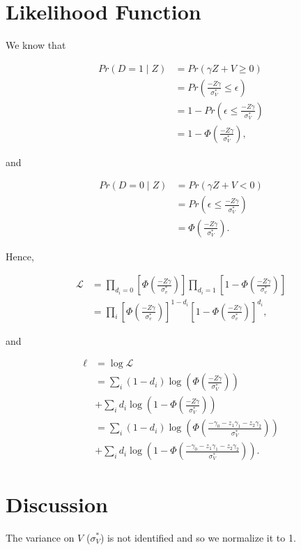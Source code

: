 \documentclass[9pt,twocolumn,twoside,]{pnas-new}
\begin{document}
\hypertarget{likelihood-function}{%
\section{Likelihood Function}\label{likelihood-function}}

We know that

\begin{align*}
Pr\left(D = 1 \mid Z\right) &= Pr\left(\gamma Z + V \geq 0 \right) \\
&= Pr\left( \frac{-Z\gamma}{\sigma^*_V} \leq \epsilon \right) \\
&= 1 - Pr\left( \epsilon \leq \frac{-Z\gamma}{\sigma^*_V} \right) \\
&= 1 - \Phi \left( \frac{-Z\gamma}{\sigma^*_V} \right),
\end{align*}

and

\begin{align*}
Pr\left(D = 0 \mid Z\right) &= Pr\left(\gamma Z + V < 0 \right) \\
&= Pr\left( \epsilon \leq \frac{-Z\gamma}{\sigma^*_V} \right) \\
&= \Phi \left( \frac{-Z\gamma}{\sigma^*_V} \right).
\end{align*}

Hence,

\begin{align*}
\mathcal{L} &= \prod_{d_i = 0} \left[ \Phi \left( \frac{-Z\gamma}{\sigma^*_v} \right) \right] \prod_{d_i = 1} \left[ 1-  \Phi \left( \frac{-Z\gamma}{\sigma^*_v} \right) \right] \\
&= \prod_{i} \left[ \Phi \left( \frac{-Z\gamma}{\sigma^*_v} \right) \right]^{1 - d_i} \left[ 1-  \Phi \left( \frac{-Z\gamma}{\sigma^*_v} \right) \right]^{d_i},
\end{align*}

and

\begin{align*}
\ell &= \log\mathcal{L} \\
&= \sum_{i} (1 - d_i) \log \left( \Phi \left( \frac{-Z\gamma}{\sigma^*_V} \right) \right) \\
&+ \sum_{i} d_i \log \left( 1 - \Phi \left( \frac{-Z\gamma}{\sigma^*_V} \right) \right) \\
&= \sum_{i} (1 - d_i) \log \left( \Phi \left( \frac{-\gamma_0 - z_1\gamma_1 - z_2\gamma_2}{\sigma^*_V} \right) \right) \\
&+ \sum_{i} d_i \log \left( 1 - \Phi \left( \frac{-\gamma_0 - z_1\gamma_1 - z_2\gamma_2}{\sigma^*_V} \right) \right).
\end{align*}

\hypertarget{discussion}{%
\section{Discussion}\label{discussion}}

The variance on \(V\) (\(\sigma^*_V\)) is not identified and so we
normalize it to 1.

\showmatmethods
\showacknow
\pnasbreak



% 
\end{document}
